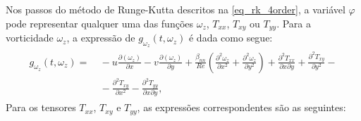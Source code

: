 Nos passos do método de Runge-Kutta descritos na \autoref{eq_rk_4order}, a variável $\varphi$ pode representar qualquer uma das funções $\omega_{z}$, $T_{xx}$, $T_{xy}$ ou $T_{yy}$. Para a vorticidade $\omega_{z}$, a expressão de $g_{\omega_{z}}(t, \omega_{z})$ é dada como segue:
\begin{gather}
    \begin{aligned}
        g_{\omega_{z}}\left(t, \omega_z\right) = &~- u\frac{\partial\left(\omega_{z}\right)}{\partial x} - v \frac{\partial\left(\omega_{z}\right)}{\partial y} + \frac{\beta_{nn}}{R e}\left(\frac{\partial^2 \omega_{z}}{\partial x^2} + \frac{\partial^2 \omega_{z}}{\partial y^2}\right) + \frac{\partial^2 T_{x x}}{\partial x \partial y} + \frac{\partial^2 T_{x y}}{\partial y^2} - \\ &~- \frac{\partial^2 T_{x y}}{\partial x^2} - \frac{\partial^2 T_{y y}}{\partial x \partial y},
    \end{aligned}
\end{gather}
Para os tensores $T_{xx}$, $T_{xy}$ e $T_{yy}$, as expressões correspondentes são as seguintes:
